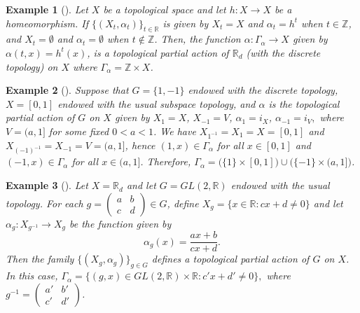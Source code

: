 \documentclass[sn-mathphys-num]{sn-jnl}%
\theoremstyle{thmstyleone}%
\theoremstyle{thmstyletwo}%
\newtheorem{example}{Example}%
\theoremstyle{thmstylethree}%
\begin{document}
\begin{example}[\cite{Abadie2}]\label{ejempartop2}%
Let $ X $ be a topological space and let $ h: X \to X $ be a homeomorphism. If $ \{(X_t, \alpha_t) \}_{t \in \mathbb{R}} $ is given by
$ X_t = X $ and $ \alpha_t = h^t $ when $ t \in \mathbb{Z} $, and $ X_t = \emptyset $ and $ \alpha_t = \emptyset $ when $ t \not \in \mathbb{Z} $. Then,  the function $ \alpha: \Gamma_ \alpha \to X $ given by $ \alpha (t, x) = h^t (x) $, is a topological partial  action of  $\mathbb{R}_d$ (with the discrete topology) on  $ X $ where $ \Gamma_ \alpha = \mathbb{Z} \times X $. %
\\
\end{example}

\begin{example}[\cite{Abadie2}]\label{ejempartop2b}%
Suppose that $G=\{1,-1\}$ endowed with the discrete topology, $X=[0,1]$ endowed with the usual subspace topology, and $\alpha$ is the topological partial action of $G$ on $X$ given by
\(
X_1 = X\),  \(X_{-1} = V\),  \( \alpha_1 = i_X\),  \(\alpha_{-1} = i_V,
\)
where $V=(a,1]$ for some fixed $0<a<1$. We have $X_{1^{-1}}=X_1=X=[0,1]$ and $X_{(-1)^{-1}}=X_{-1}=V=(a,1]$, hence $(1,x)\in\Gamma_\alpha$ for all $x\in[0,1]$ and  $(-1,x)\in\Gamma_\alpha$ for all $x\in(a,1]$. Therefore,
\(
\Gamma_\alpha
=
\big(\{1\}\times[0,1]\big)
\cup
\big(\{-1\}\times(a,1]\big)
\). \\
\end{example}

\begin{example}[\cite{Choi}]%
Let $X=\mathbb{R}_d$ and let $G=GL(2,\mathbb{R})$ endowed with the usual topology.
For each
$g=\begin{pmatrix} a & b \\ c & d \end{pmatrix}\in G$, define
\(
X_g=\{x\in\mathbb{R}:cx+d\neq 0\}
\)
and let $\alpha_g:X_{g^{-1}}\to X_g$ be the function given by
\[
\alpha_g(x)=\frac{ax+b}{cx+d}.
\]
Then the family $\{(X_g,\alpha_g)\}_{g\in G}$ defines a topological partial
action of $G$ on $X$. In this case,
\(
\Gamma_\alpha=\{(g,x)\in GL(2,\mathbb{R})\times\mathbb{R}:c'x+d'\neq 0\},
\)
where
$g^{-1}=\begin{pmatrix} a' & b' \\ c' & d' \end{pmatrix}$.\\
\end{example}
\end{document}
